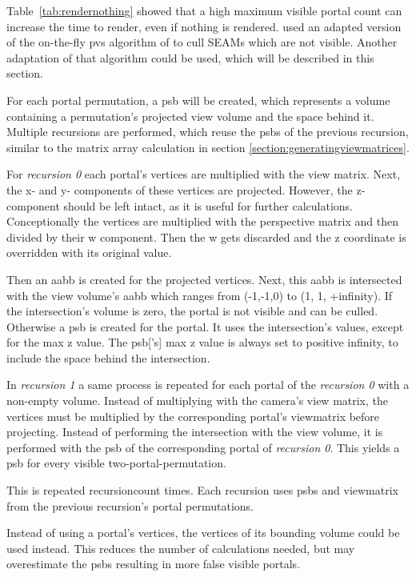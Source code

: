 Table~\ref{tab:rendernothing} showed that a high maximum visible portal count can increase the time to render, even if nothing is rendered. \textcite{schmalstieg:1999:sewing} used an adapted version of the on-the-fly \gls{pvs} algorithm of \textcite{luebke:1995:portals} to cull SEAMs which are not visible. Another adaptation of that algorithm could be used, which will be described in this section.

For each portal permutation, a \gls{psb} will be created, which represents a volume containing a permutation's projected view volume and the space behind it. Multiple recursions are performed, which reuse the \glspl{psb} of the previous recursion, similar to the matrix array calculation in section \ref{section:generatingviewmatrices}.

For \textit{recursion 0} each portal's vertices are multiplied with the view matrix. Next, the x- and y- components of these vertices are projected. However, the z-component should be left intact, as it is useful for further calculations. Conceptionally the vertices are multiplied with the perspective matrix and then divided by their w component. Then the w gets discarded and the z coordinate is overridden with its original value.

Then an \gls{aabb} is created for the projected vertices. Next, this \gls{aabb} is intersected with the view volume's \gls{aabb} which ranges from (-1,-1,0) to (1, 1, +infinity). If the intersection's volume is zero, the portal is not visible and can be culled. Otherwise a \gls{psb} is created for the portal. It uses the intersection's values, except for the max z value. The \gls{psb}['s] max z value is always set to positive infinity, to include the space behind the intersection.

In \textit{recursion 1} a same process is repeated for each portal of the \textit{recursion 0} with a non-empty volume. Instead of multiplying with the camera's view matrix, the vertices must be multiplied by the corresponding portal's \gls{viewmatrix} before projecting. Instead of performing the intersection with the view volume, it is performed with the \gls{psb} of the corresponding portal of \textit{recursion 0}. This yields a \gls{psb} for every visible two-portal-permutation.

This is repeated \gls{recursioncount} times. Each recursion uses \glspl{psb} and \gls{viewmatrix} from the previous recursion's portal permutations.

Instead of using a portal's vertices, the vertices of its bounding volume could be used instead. This reduces the number of calculations needed, but may overestimate the \glspl{psb} resulting in more false visible portals.

